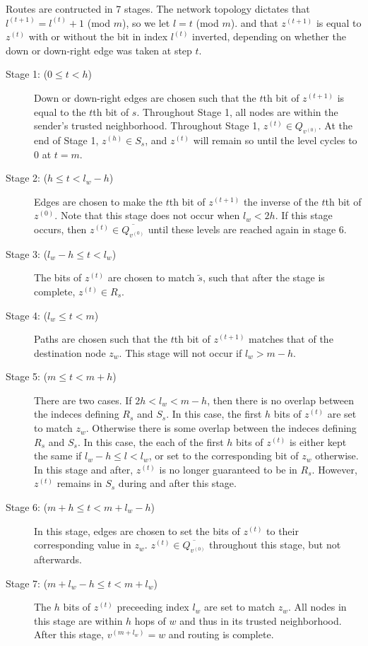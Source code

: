 \documentclass[prodmode,permissions]{acmsmall-ec16}
\begin{document}
Routes are contructed in 7 stages.
The network topology dictates that $l^{(t+1)} = l^{(t)} + 1$ (mod $m$),
so we let $l = t$ (mod $m$).
and that $z^{(t+1)}$ is equal to $z^{(t)}$ with or without the bit in index
$l^{(t)}$ inverted, depending on whether the down or down-right edge was
taken at step $t$.
\begin{description}
\item[Stage 1: ($0 \leq t < h$)]{
Down or down-right edges
are chosen such that the $t$th bit of $z^{(t+1)}$ is equal to the $t$th bit
of $s$.
Throughout Stage 1, all nodes are within the sender's trusted neighborhood.
Throughout Stage 1, $z^{(t)} \in Q_{v^{(0)}}$.
At the end of Stage 1, $z^{(h)} \in S_s$, and $z^{(t)}$ will remain so until the level cycles to $0$ at $t = m$.
}
\item[Stage 2: ($h \leq t < l_w - h$)]{
Edges are chosen to make the $t$th bit of
$z^{(t+1)}$ the inverse of the $t$th bit of $z^{(0)}$.
Note that this stage does not occur when $l_w < 2h$.
If this stage occurs, then $z^{(t)} \in \overline{Q_{v^{(0)}}}$ until these
levels are reached again in stage 6.
}
\item[Stage 3: ($l_w - h \leq t < l_w$)]{
The bits of $z^{(t)}$ are chosen to match $\tilde{s}$,
such that after the stage is complete, $z^{(t)} \in R_s$.
}
\item[Stage 4: ($l_w \leq t < m$)]{
Paths are chosen such that the $t$th bit of $z^{(t+1)}$ matches that of the
destination node $z_w$.
This stage will not occur if $l_w > m - h$.
}
\item[Stage 5: ($m \leq t < m + h$)]{
There are two cases.
If $2h < l_w < m - h$,
then there is no overlap between the indeces defining $R_s$ and $S_s$.
In this case, the first $h$ bits of $z^{(t)}$ are set to
match $z_w$.
Otherwise there is some overlap between the indeces defining $R_s$ and
$S_s$.
In this case, the each of the first $h$ bits of $z^{(t)}$ is either kept the
same if $l_w - h \leq l < l_w$, or set to the corresponding bit of $z_w$
otherwise.
In this stage and after, $z^{(t)}$ is no longer guaranteed to be in $R_s$.
However, $z^{(t)}$ remains in $S_s$ during and after this stage.
}
\item[Stage 6: ($m + h \leq t < m + l_w - h$)]{
In this stage, edges are chosen to set the bits of $z^{(t)}$ to their
corresponding value in $z_w$.
$z^{(t)} \in \overline{Q_{v^{(0)}}}$ throughout this stage,
but not afterwards.
}
\item[Stage 7: ($m + l_w - h \leq t < m + l_w$)] {
The $h$ bits of $z^{(t)}$
preceeding index $l_w$ are set to match $z_w$.
All nodes in this stage are within $h$ hops of $w$ and thus in its trusted
neighborhood.
After this stage, $v^{(m + l_w)} = w$ and routing is complete.
}
\end{description}
\end{document}
